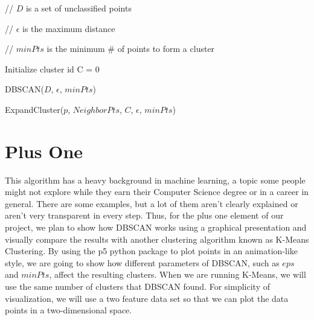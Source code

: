\documentclass{article}
\begin{document}
\begin{algorithm}[H]
    // $D$ is a set of unclassified points\;
    
    // $\epsilon$ is the maximum distance
    
    // $minPts$ is the minimum \# of points to form a cluster
    
    Initialize cluster id C = 0\;
    
 \caption{DBSCAN($D$, $\epsilon$, $minPts$)}
\end{algorithm}

\begin{algorithm}[H]
    
 \caption{ExpandCluster($p$, $NeighborPts$, $C$, $\epsilon$, $minPts$)}
\end{algorithm}
\newpage
\section{Plus One}
This algorithm has a heavy background in machine learning, a topic some people might not explore while they earn their Computer Science degree or in a career in general. There are some examples, but a lot of them aren't clearly explained or aren't very transparent in every step. Thus, for the plus one element of our project, we plan to show how DBSCAN works using a graphical presentation and visually compare the results with another clustering algorithm known as K-Means Clustering. By using the p5 python package to plot points in an animation-like style, we are going to show how different parameters of DBSCAN, such as $eps$ and $minPts$, affect the resulting clusters. When we are running K-Means, we will use the same number of clusters that DBSCAN found. For simplicity of visualization, we will use a two feature data set so that we can plot the data points in a two-dimensional space. 
\end{document}
